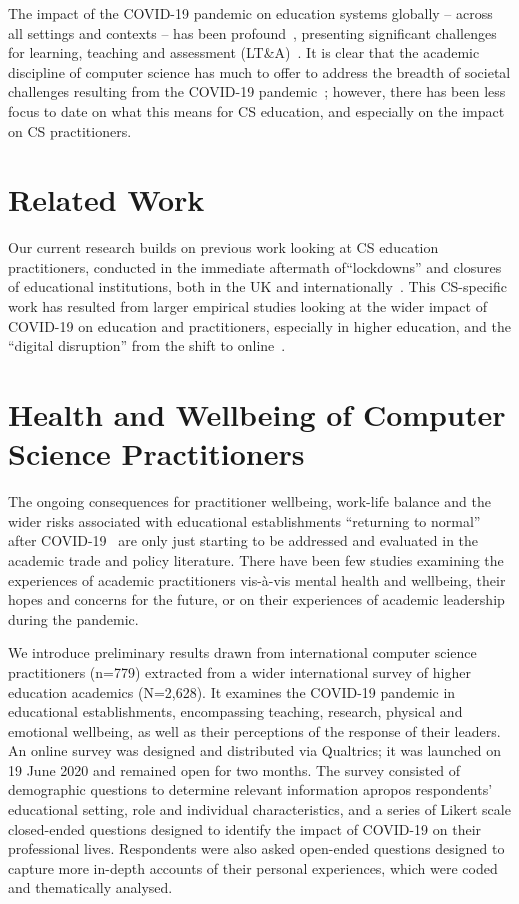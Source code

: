 \documentclass[manuscript,review]{acmart}
\begin{document}
The impact of the COVID-19 pandemic on education systems globally --
across all settings and contexts -- has been
profound~\cite{unescocovidedu:2021}, presenting significant challenges
for learning, teaching and assessment
(LT\&A)~\cite{itnowdigedu:2021}. It is clear that the academic
discipline of computer science has much to offer to address the
breadth of societal challenges resulting from the COVID-19
pandemic~\cite{cerf:2020}; however, there has been less focus to date
on what this means for CS education, and especially on the impact on
CS practitioners.

\section{Related Work}

Our current research builds on previous work looking at CS education
practitioners, conducted in the immediate aftermath of``lockdowns''
and closures of educational institutions, both in the UK and
internationally~\cite{crick-et-al:ukicer2020,crick-et-alposter:sigcse2021,crick-et-al:educon2021,wg1:iticse2021}. This
CS-specific work has resulted from larger empirical studies looking at
the wider impact of COVID-19 on education and practitioners,
especially in higher education, and the ``digital disruption'' from
the shift to
online~\cite{watermeyer-et-al:he2021,shankar-et-al:ies2021,watermeyer-et-al:bjse2021}.

\section{Health and Wellbeing of Computer Science Practitioners}

The ongoing consequences for practitioner wellbeing,
work-life balance and the wider risks associated with educational
establishments ``returning to normal'' after
COVID-19~\cite{yamey+walensky:2020} are only just starting to be addressed
and evaluated in the academic trade and policy literature. There have
been few studies examining the experiences of academic practitioners
vis-à-vis mental health and wellbeing, their hopes and
concerns for the future, or on their experiences of academic
leadership during the pandemic.

We introduce preliminary results drawn from international computer
science practitioners (n=779) extracted from a wider international
survey of higher education academics (N=2,628). It examines the
COVID-19 pandemic in educational establishments, encompassing
teaching, research, physical and emotional wellbeing, as well as their
perceptions of the response of their leaders. An online survey was
designed and distributed via Qualtrics; it was launched on 19 June
2020 and remained open for two months. The survey consisted of
demographic questions to determine relevant information apropos
respondents’ educational setting, role and individual characteristics,
and a series of Likert scale closed-ended questions designed to
identify the impact of COVID-19 on their professional
lives. Respondents were also asked open-ended questions designed to
capture more in-depth accounts of their personal experiences, which
were coded and thematically analysed.
\end{document}
